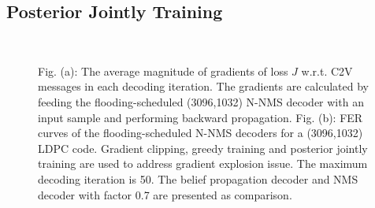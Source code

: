 \documentclass [PhD] {uclathes}
\begin{document}
\subsection{Posterior Jointly Training}\label{Sec: gradient_explosion}
\begin{figure}[hp] 
    \centering
    \\
  \caption{Fig. (a): The average magnitude of gradients of loss $J$ w.r.t. C2V messages in each decoding iteration. The gradients are calculated by feeding the flooding-scheduled (3096,1032) N-NMS decoder with an input sample and performing backward propagation. Fig. (b): FER curves of the flooding-scheduled N-NMS decoders for a (3096,1032) LDPC code.  Gradient clipping, greedy training and posterior jointly training are used to address gradient explosion issue. The maximum decoding iteration is 50. The belief propagation decoder and NMS decoder with factor 0.7 are presented as comparison.}
\end{figure}
\end{document}
